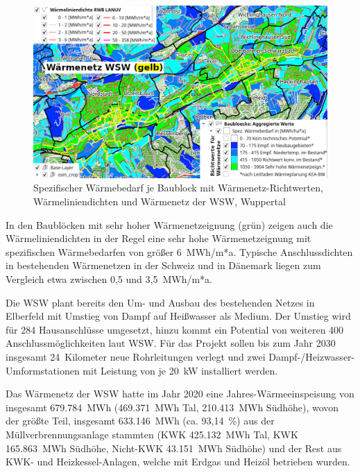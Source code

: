 		\begin{figure}[h]
			\centering
			\includegraphics[width=\linewidth]{./Medien/own/baubloecke/baubloecke_spez_wb_wld_osm_wsw.png}
			\caption{Spezifischer Wärmebedarf je Baublock mit Wärmenetz-Richtwerten, Wärmeliniendichten und Wärmenetz der WSW, Wuppertal}
			\label{fig:analyse:baubloecke_spez_wb_wld_osm_wsw}
		\end{figure}
		
		In den Baublöcken mit sehr hoher Wärmenetzeignung (grün) zeigen auch die Wärmeliniendichten in der Regel eine sehr hohe Wärmenetzeignung mit spezifischen Wärmebedarfen von größer 6~MWh/m*a. Typische Anschlussdichten in bestehenden Wärmenetzen in der Schweiz und in Dänemark liegen zum Vergleich etwa zwischen 0,5 und 3,5~MWh/m*a. \cite{web_wiefm} 
		
		Die WSW plant bereits den Um- und Ausbau des bestehenden Netzes in Elberfeld mit Umstieg von Dampf auf Heißwasser als Medium. Der Umstieg wird für 284 Hausanschlüsse umgesetzt, hinzu kommt ein Potential von weiteren 400 Anschlussmöglichkeiten laut WSW. Für das Projekt sollen bis zum Jahr 2030 insgesamt 24~Kilometer neue Rohrleitungen verlegt und zwei Dampf-/Heizwasser-Umformstationen mit Leistung von je 20~kW installiert werden. \cite{web_wsw_talwaerme}

		Das Wärmenetz der WSW hatte im Jahr 2020 eine Jahres-Wärmeeinspeisung von insgesamt 679.784~MWh (469.371~MWh Tal, 210.413~MWh Südhöhe), wovon der größte Teil, insgesamt 633.146~MWh (ca. 93,14~\%) aus der Müllverbrennungsanlage stammten (KWK 425.132~MWh Tal, KWK 165.863~MWh Südhöhe, Nicht-KWK 43.151~MWh Südhöhe) und der Rest aus KWK- und Heizkessel-Anlagen, welche mit Erdgas und Heizöl betrieben wurden.\cite[s. Häufige Fragen, Bescheinigung EE-Anteile]{web_wsw_talwaerme} 
		
